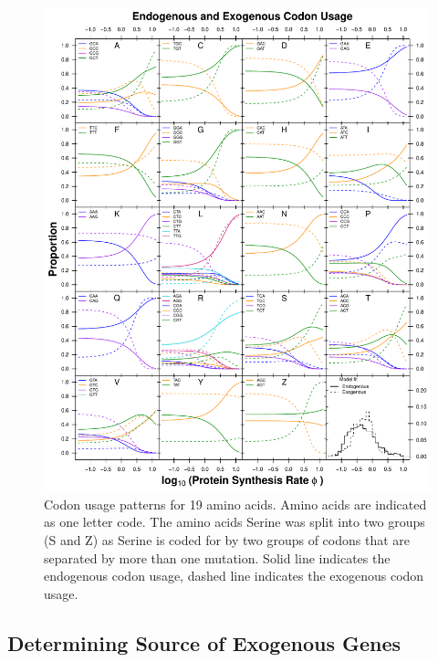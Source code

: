 \documentclass[fleqn,letterpaper]{article}
\begin{document}

\begin{figure}
     \centering
	\includegraphics[width=\textwidth]{img/CUB_cleft_main.pdf}
	\caption{Codon usage patterns for 19 amino acids. Amino acids are indicated as one letter code. 
	The amino acids Serine was split into two groups (S and Z) as Serine is coded for by two groups of codons that are separated by more than one mutation.
	Solid line indicates the endogenous codon usage, dashed line indicates the exogenous codon usage.}
	\label{fig:cub_endo_exo}
\end{figure}



\subsection*{Determining Source of Exogenous Genes}
\end{document}

